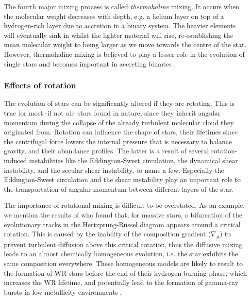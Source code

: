 \documentclass[../../main/thesis_msc.tex]{subfiles}
\begin{document}
						The fourth major mixing process is called \emph{thermohaline} mixing. It occurs when the molecular weight decreases with depth, e.g. a helium layer on top of a hydrogen-rich layer due to accretion in a binary system. The heavier elements will eventually sink in whilst the lighter material will rise, re-establishing the mean molecular weight to being larger as we move towards the centre of the star. However, thermohaline mixing is believed to play a lesser role in the evolution of single stars and becomes important in accreting binaries \citep[see also][]{Cantiello, Charbonnel}.
		
						
						
						
						
					\subsubsection{Effects of rotation}
					
						The evolution of stars can be significantly altered if they are rotating. This is true for most -if not all- stars found in nature, since they inherit angular momentum during the collapse of the already turbulent molecular cloud they originated from. Rotation can influence the shape of stars, their lifetimes since the centrifugal force lowers the internal pressure that is necessary to balance gravity, and their abundance profiles. The latter is a result of several rotation-induced instabilities like the Eddington-Sweet circulation, the dynamical shear instability, and the secular shear instability, to name a few. Especially the Eddington-Sweet circulation and the shear instability play an important role to the transportation of angular momentum between different layers of the star. 
						
						The importance of rotational mixing is difficult to be overstated. As an example, we mention the results of \cite{Maeder1987} who found that, for massive stars, a bifurcation of the evolutionary tracks in the Hertzprung-Russel diagram appears around a critical rotation. This is caused by the inability of the composition gradient ($\nabla_{\mu}$) to prevent turbulent diffusion above this critical rotation, thus the diffusive mixing leads to an almost chemically homogeneous evolution, i.e. the star exhibits the same composition everywhere. These homogeneous models are likely to result to the formation of WR stars before the end of their hydrogen-burning phase, which increases the WR lifetime, and potentially lead to the formation of gamma-ray bursts in low-metallicity environments \citep{Yoon2005}.
						
\end{document}
